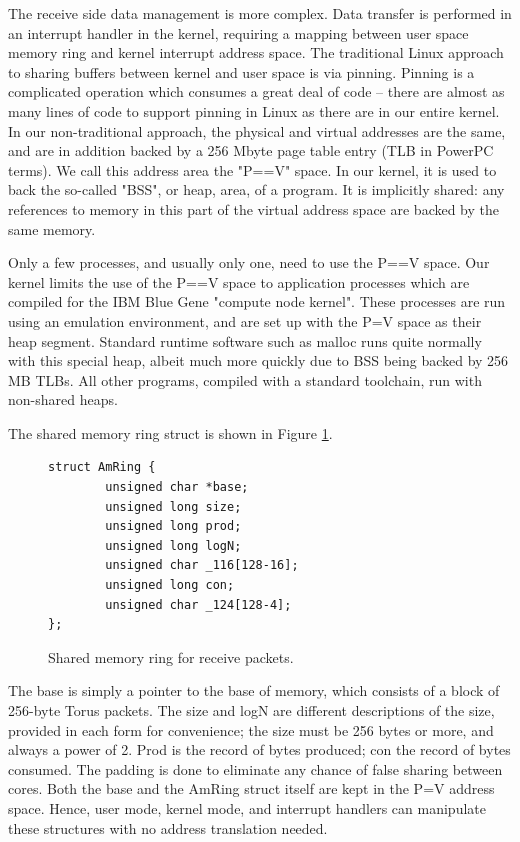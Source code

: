\documentclass[letterpaper,twocolumn,10pt]{article}
\begin{document}
The receive side data management is more complex. Data transfer is performed in an interrupt 
handler in the kernel, requiring a mapping between user space memory ring and kernel interrupt address space. 
The traditional Linux approach to sharing buffers between kernel and user space is via pinning. Pinning is a complicated 
operation which consumes a great deal of code -- there are almost as many lines of code to support 
pinning in Linux as there are in our entire kernel. 
In our  non-traditional approach, the physical and virtual addresses are the same, and are in addition backed by a 
256 Mbyte page table entry (TLB in PowerPC terms). 
We call this address area the "P==V" space. In our kernel, it is used to back the so-called "BSS", or heap, area, of a program. It is implicitly
shared: any references to memory in this part of the virtual address space are backed by the same memory. 

Only a few processes, and usually only one, need to use the P==V space. 
Our kernel limits the use of the P==V space to application processes which are compiled for the
IBM Blue Gene "compute node kernel". These
processes are run using an emulation environment\cite{plan9bgp}, and are set up with the P=V 
space as their heap segment. Standard runtime software such as malloc runs quite normally with this 
special heap, albeit much more quickly due to BSS being backed by 256 MB TLBs. All other programs,
compiled with a standard toolchain, run with non-shared heaps.

The shared memory ring struct is shown in Figure \ref{ring}. 
\begin{figure}
\begin{verbatim}
struct AmRing {
        unsigned char *base;
        unsigned long size;
        unsigned long prod;
        unsigned long logN;
        unsigned char _116[128-16];
        unsigned long con;
        unsigned char _124[128-4];
};
\end{verbatim}
\caption{\label{ring}Shared memory ring for receive packets.}
\end{figure}

The base is simply a pointer to the base of memory, which consists of a block of 256-byte Torus packets. 
The size and logN are different descriptions of the size, provided in each form for convenience;
 the size must be 256 bytes or more, and always a power of 2. Prod
is the record of bytes produced; con the record of bytes consumed. The padding is done to eliminate any 
chance of false sharing between cores. Both the base and the AmRing struct itself are kept in the P=V 
address space. Hence, user mode, kernel mode, and interrupt handlers can manipulate these structures
with no address translation needed. 
\end{document}
